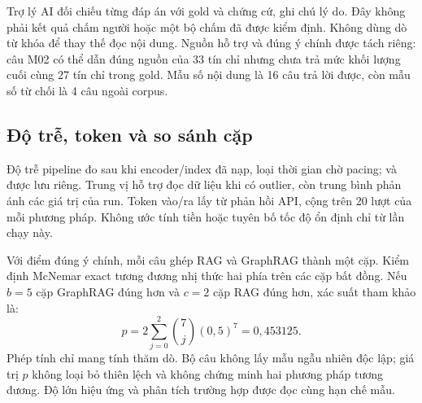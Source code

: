 Trợ lý AI đối chiếu từng đáp án với gold và chứng cứ, ghi chú lý do. Đây không phải kết quả chấm người hoặc một bộ chấm đã được kiểm định. Không dùng dò từ khóa để thay thế đọc nội dung. Nguồn hỗ trợ và đúng ý chính được tách riêng: câu M02 có thể dẫn đúng nguồn của 33 tín chỉ nhưng chưa trả mức khối lượng cuối cùng 27 tín chỉ trong gold. Mẫu số nội dung là 16 câu trả lời được, còn mẫu số từ chối là 4 câu ngoài corpus.

\subsection{Độ trễ, token và so sánh cặp}
Độ trễ pipeline đo sau khi encoder/index đã nạp, loại thời gian chờ pacing;  và  được lưu riêng. Trung vị hỗ trợ đọc dữ liệu khi có outlier, còn trung bình phản ánh các giá trị của run. Token vào/ra lấy từ phản hồi API, cộng trên 20 lượt của mỗi phương pháp. Không ước tính tiền hoặc tuyên bố tốc độ ổn định chỉ từ lần chạy này.

Với điểm đúng ý chính, mỗi câu ghép RAG và GraphRAG thành một cặp. Kiểm định McNemar exact tương đương nhị thức hai phía trên các cặp bất đồng. Nếu $b=5$ cặp GraphRAG đúng hơn và $c=2$ cặp RAG đúng hơn, xác suất tham khảo là:
\begin{equation}
 p=2\sum_{j=0}^{2}\binom{7}{j}(0{,}5)^7=0{,}453125.
\end{equation}
Phép tính chỉ mang tính thăm dò. Bộ câu không lấy mẫu ngẫu nhiên độc lập; giá trị $p$ không loại bỏ thiên lệch và không chứng minh hai phương pháp tương đương. Độ lớn hiệu ứng và phân tích trường hợp được đọc cùng hạn chế mẫu.
